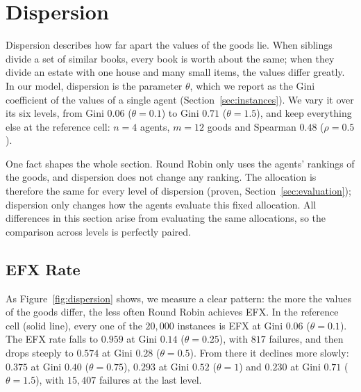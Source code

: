 \section{Dispersion}\label{sec:dispersion}

Dispersion describes how far apart the values of the goods lie. When siblings divide a set of
similar books, every book is worth about the same; when they divide an estate with one house and
many small items, the values differ greatly. In our model, dispersion is the parameter $\theta$,
which we report as the Gini coefficient of the values of a single agent
(Section~\ref{sec:instances}). We vary it over its six levels, from Gini $0.06$ ($\theta=0.1$) to
Gini $0.71$ ($\theta=1.5$), and keep everything else at the reference cell: $n=4$ agents, $m=12$
goods and Spearman $0.48$ ($\rho=0.5$).

One fact shapes the whole section. Round Robin only uses the agents' rankings of the goods, and
dispersion does not change any ranking. The allocation is therefore the same for every level of
dispersion (proven, Section~\ref{sec:evaluation}); dispersion only changes how the agents
evaluate this fixed allocation. All differences in this section arise from evaluating the same
allocations, so the comparison across levels is perfectly paired.

\subsection{EFX Rate}\label{sec:dispersion-rate}

As Figure~\ref{fig:dispersion} shows, we measure a clear pattern: the more the values of the goods differ, the less often
Round Robin achieves EFX. In the reference cell (solid line), every one of the $20{,}000$
instances is EFX at Gini $0.06$ ($\theta=0.1$). The EFX rate falls to $0.959$ at Gini $0.14$
($\theta=0.25$), with $817$ failures, and then drops steeply to $0.574$ at Gini $0.28$
($\theta=0.5$). From there it declines more slowly: $0.375$ at Gini $0.40$ ($\theta=0.75$),
$0.293$ at Gini $0.52$ ($\theta=1$) and $0.230$ at Gini $0.71$ ($\theta=1.5$), with $15{,}407$
failures at the last level.

